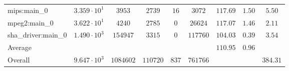 \begin{tabular}{|l|c|c|c|c|c|c|c|c|}
mips:main\_0            & $ 3.359 \cdot 10^{1} $ & $ 3953    $ & $ 2739   $ & $ 16  $ & $ 3072   $ & $ 117.69      $ & $ 1.50    $ & $ 5.50    $ \\
mpeg2:main\_0           & $ 3.622 \cdot 10^{1} $ & $ 4240    $ & $ 2785   $ & $ 0   $ & $ 26624  $ & $ 117.07      $ & $ 1.46    $ & $ 2.11    $ \\
sha\_driver:main\_0     & $ 1.490 \cdot 10^{3} $ & $ 154947  $ & $ 3315   $ & $ 0   $ & $ 117760 $ & $ 104.03      $ & $ 0.39    $ & $ 3.54    $ \\
\hline
Average                 & $                    $ & $         $ & $        $ & $     $ & $        $ & $ 110.95      $ & $ 0.96    $ & $         $ \\
\hline
Overall                 & $ 9.647 \cdot 10^{3} $ & $ 1084602 $ & $ 110720 $ & $ 837 $ & $ 761766 $ & $             $ & $         $ & $ 384.31  $ \\
\hline
\end{tabular}
